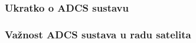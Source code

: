 \documentclass[times, utf8, diplomski, numeric]{templates/template}
\begin{document}
{{{{                \subsubsection{Ukratko o ADCS sustavu}{
                    }

                    \subsubsection{Važnost ADCS sustava u radu satelita}{
                    }
            }
        }
    }
}
\end{document}
